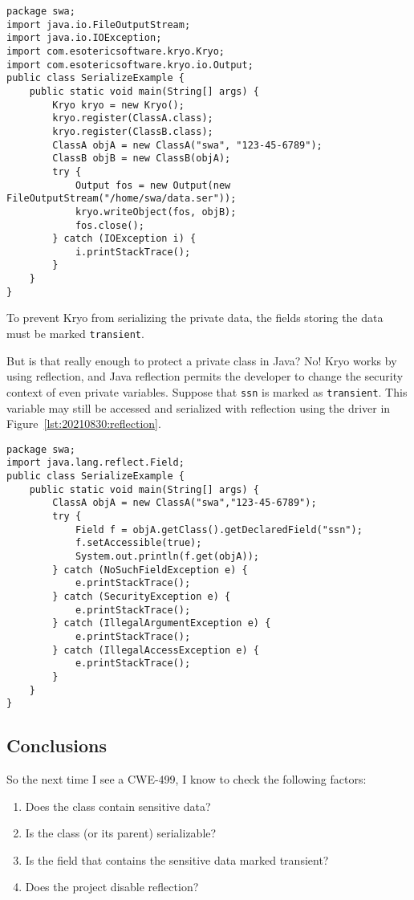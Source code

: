 \begin{lstlisting}[caption={Kryo Driver},captionpos=b,style=JavaStyle,basicstyle=\scriptsize,label={lst:20210830:kryo}]
package swa;
import java.io.FileOutputStream;
import java.io.IOException;
import com.esotericsoftware.kryo.Kryo;
import com.esotericsoftware.kryo.io.Output;
public class SerializeExample {
	public static void main(String[] args) {
		Kryo kryo = new Kryo();
		kryo.register(ClassA.class);
		kryo.register(ClassB.class);
		ClassA objA = new ClassA("swa", "123-45-6789");
		ClassB objB = new ClassB(objA);
		try {
			Output fos = new Output(new FileOutputStream("/home/swa/data.ser"));
			kryo.writeObject(fos, objB);
			fos.close();
		} catch (IOException i) {
			i.printStackTrace();
		}
	}
}
\end{lstlisting}

To prevent Kryo from serializing the private data, the fields storing the data must be marked \texttt{transient}.

But is that really enough to protect a private class in Java? No! Kryo works by using reflection, and Java reflection permits the developer to change the security context of even private variables. Suppose that \texttt{ssn} is marked as \texttt{transient}. This variable may still be accessed and serialized with reflection using the driver in Figure~\ref{lst:20210830:reflection}.

\begin{lstlisting}[caption={Reflection Driver},captionpos=b,style=JavaStyle,basicstyle=\scriptsize,label={lst:20210830:reflection}]
package swa;
import java.lang.reflect.Field;
public class SerializeExample {
	public static void main(String[] args) {
		ClassA objA = new ClassA("swa","123-45-6789");
		try {
			Field f = objA.getClass().getDeclaredField("ssn");
			f.setAccessible(true);
			System.out.println(f.get(objA));
		} catch (NoSuchFieldException e) {
			e.printStackTrace();
		} catch (SecurityException e) {
			e.printStackTrace();
		} catch (IllegalArgumentException e) {
			e.printStackTrace();
		} catch (IllegalAccessException e) {
			e.printStackTrace();
		}
	}
}
\end{lstlisting}

\subsection{Conclusions}
So the next time I see a CWE-499, I know to check the following factors:
\begin{enumerate}
	\item Does the class contain sensitive data?
	\item Is the class (or its parent) serializable?
	\item Is the field that contains the sensitive data marked transient?
	\item Does the project disable reflection?
\end{enumerate}

